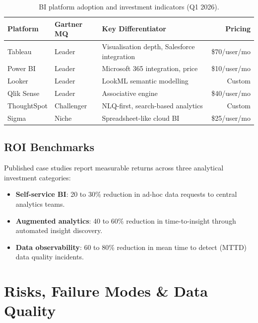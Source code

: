 \documentclass[12pt, a4paper]{article}
\begin{document}
\begin{table}[ht]
\centering
\caption{BI platform adoption and investment indicators (Q1 2026).}
\label{tab:bi-market}
\begin{tabular}{l l >{\raggedright\arraybackslash}p{5.0cm} r}
\toprule
\textbf{Platform} & \textbf{Gartner MQ} & \textbf{Key Differentiator} & \textbf{Pricing} \\
\midrule
Tableau       & Leader     & Visualisation depth, Salesforce integration & \$70/user/mo \\
Power BI      & Leader     & Microsoft 365 integration, price    & \$10/user/mo \\
Looker        & Leader     & LookML semantic modelling           & Custom \\
Qlik Sense    & Leader     & Associative engine                  & \$40/user/mo \\
ThoughtSpot   & Challenger & NLQ-first, search-based analytics   & Custom \\
Sigma         & Niche      & Spreadsheet-like cloud BI           & \$25/user/mo \\
\bottomrule
\end{tabular}
\end{table}

\subsection{ROI Benchmarks}
Published case studies report measurable returns across three analytical investment categories:

\begin{itemize}
    \item \textbf{Self-service BI}: 20 to 30\% reduction in ad-hoc data requests to central analytics teams.
    \item \textbf{Augmented analytics}: 40 to 60\% reduction in time-to-insight through automated insight discovery.
    \item \textbf{Data observability}: 60 to 80\% reduction in mean time to detect (MTTD) data quality incidents.
\end{itemize}

\section{Risks, Failure Modes \& Data Quality}\label{sec:risks}
\end{document}
